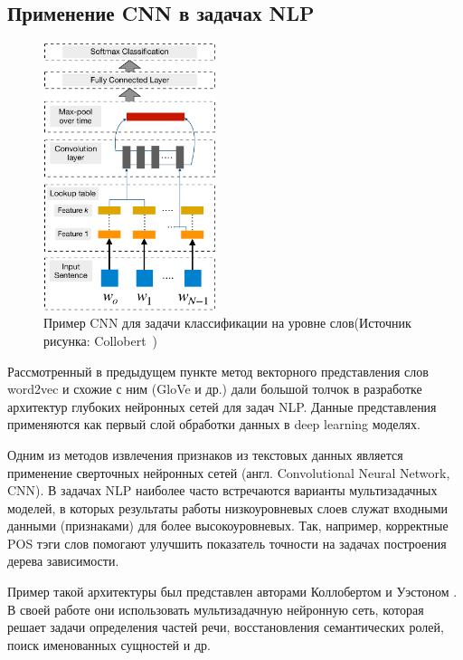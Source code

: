 \subsection{Применение CNN в задачах NLP}
\label{subsec:cnn}

\begin{figure}[h]

\centering
\includegraphics[width=0.45\textwidth]{img/collobertCNN.pdf}
\caption{\label{fig:collobertCNN}Пример CNN для задачи классификации на уровне слов\hspace{\textwidth}(Источник рисунка: Collobert~\autocite{10.1145/1390156.1390177})}
\end{figure}
Рассмотренный в предыдущем пункте метод векторного представления слов word2vec и схожие с ним (GloVe и др.) дали большой толчок в разработке архитектур глубоких нейронных сетей для задач NLP. Данные представления применяются  как первый слой обработки данных в deep learning моделях. 

Одним из методов извлечения признаков из текстовых данных является применение сверточных нейронных сетей (англ. Convolutional Neural Network, CNN).
В задачах NLP наиболее часто встречаются варианты мультизадачных моделей, в которых результаты работы низкоуровневых слоев служат входными данными (признаками) для более высокоуровневых. Так, например, корректные POS тэги слов помогают улучшить показатель точности на задачах построения дерева зависимости. 

Пример такой архитектуры был представлен авторами Коллобертом и Уэстоном \autocite{DBLP:journals/corr/abs-1103-0398}. В своей работе они использовать мультизадачную нейронную сеть, которая решает задачи определения частей речи, восстановления семантических ролей, поиск именованных сущностей и др. 

